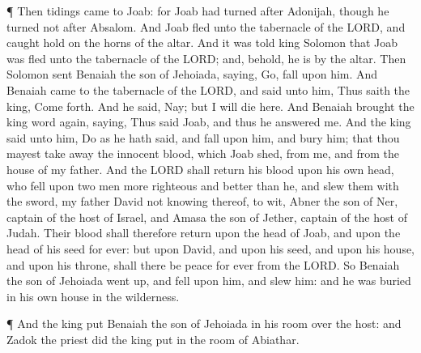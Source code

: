  ¶ Then tidings came to Joab: for Joab had turned after
Adonijah, though he turned not after Absalom. And Joab fled unto the
tabernacle of the LORD, and caught hold on the horns of the altar.
 And it was told king Solomon that Joab was fled unto the
tabernacle of the LORD; and, behold, he is by the altar. Then Solomon
sent Benaiah the son of Jehoiada, saying, Go, fall upon him.
 And Benaiah came to the tabernacle of the LORD, and said
unto him, Thus saith the king, Come forth. And he said, Nay; but I will
die here. And Benaiah brought the king word again, saying, Thus said
Joab, and thus he answered me.  And the king said unto him,
Do as he hath said, and fall upon him, and bury him; that thou mayest
take away the innocent blood, which Joab shed, from me, and from the
house of my father.  And the LORD shall return his blood
upon his own head, who fell upon two men more righteous and better than
he, and slew them with the sword, my father David not knowing thereof,
to wit, Abner the son of Ner, captain of the host of Israel, and Amasa
the son of Jether, captain of the host of Judah.  Their
blood shall therefore return upon the head of Joab, and upon the head of
his seed for ever: but upon David, and upon his seed, and upon his
house, and upon his throne, shall there be peace for ever from the LORD.
 So Benaiah the son of Jehoiada went up, and fell upon him,
and slew him: and he was buried in his own house in the wilderness.

 ¶ And the king put Benaiah the son of Jehoiada in his room
over the host: and Zadok the priest did the king put in the room of
Abiathar.

